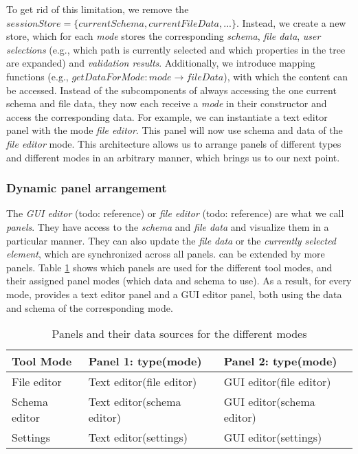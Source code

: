 To get rid of this limitation, we remove the $sessionStore = \{currentSchema, currentFileData, ...\}$.
Instead, we create a new store, which for each \textit{mode} stores the corresponding \textit{schema}, \textit{file data}, \textit{user selections} (e.g., which path is currently selected and which properties in the tree are expanded) and \textit{validation results}.
Additionally, we introduce mapping functions (e.g., $getDataForMode: mode \rightarrow {fileData}$), with which the content can be accessed.
Instead of the subcomponents of \toolname{} always accessing the one current schema and file data, they now each receive a \textit{mode} in their constructor and access the corresponding data.
For example, we can instantiate a text editor panel with the mode \textit{file editor}.
This panel will now use schema and data of the \textit{file editor} mode.
This architecture allows us to arrange panels of different types and different modes in an arbitrary manner, which brings us to our next point.



\subsubsection{Dynamic panel arrangement}\label{subsubsec:dynamic_panels}
The \textit{GUI editor} (todo: reference) or \textit{file editor} (todo: reference) are what we call \textit{panels}.
They have access to the \textit{schema} and \textit{file data} and visualize them in a particular manner.
They can also update the \textit{file data} or the \textit{currently selected element}, which are synchronized across all panels.
\toolname{} can be extended by more panels.
Table \ref{tab:panels_by_mode} shows which panels are used for the different tool modes, and their assigned panel modes (which data and schema to use).
As a result, for every mode, \toolname{} provides a text editor panel and a GUI editor panel, both using the data and schema of the corresponding mode.

\begin{table}[!t]
\caption{Panels and their data sources for the different modes}
\label{tab:panels_by_mode}
\centering\scriptsize
\begin{tabular}{@{}lll@{}}
\toprule
\textbf{Tool Mode} & \textbf{Panel 1: type(mode)} & \textbf{Panel 2: type(mode)} \\ \midrule
File editor        & Text editor(file editor)     & GUI editor(file editor)      \\
Schema editor      & Text editor(schema editor)   & GUI editor(schema editor)    \\
Settings           & Text editor(settings)        & GUI editor(settings)         \\ \bottomrule
\end{tabular}
\end{table}

